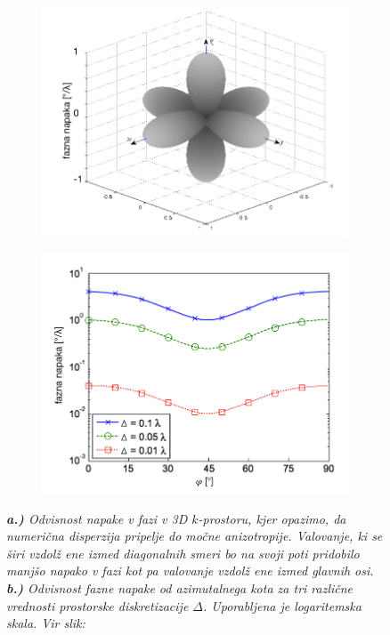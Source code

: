 \documentclass[longbibliography,slovene,a4paper,12pt]{book}
\begin{document}
\begin{figure}[h!]
	\centering
	\begin{subfigure}[b]{0.45\textwidth}
	\includegraphics[width=\textwidth]{slike/phase_error_3D.png}
	\label{fig:phaseerror3D}
	\end{subfigure}\quad
	\begin{subfigure}[b]{0.45\textwidth}
	\includegraphics[width=\textwidth]{slike/phase_error_azimuthal.png}
	\label{fig:phaseerrorazimuthal}
	\end{subfigure}
	\caption{\emph{\textbf{a.)} Odvisnost napake v fazi v 3D $k$-prostoru, kjer opazimo, da numerična disperzija pripelje do močne anizotropije. Valovanje, ki se širi vzdolž ene izmed diagonalnih smeri bo na svoji poti pridobilo manjšo napako v fazi kot pa valovanje vzdolž ene izmed glavnih osi. \textbf{b.)} Odvisnost fazne napake od azimutalnega kota za tri različne vrednosti prostorske diskretizacije $\Delta$. Uporabljena je logaritemska skala. Vir slik: \cite{gedney}}}
\end{figure}
\end{document}
